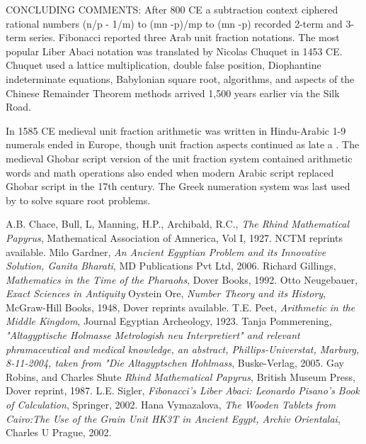 \documentclass[12pt]{article}
\begin{document}
CONCLUDING COMMENTS: After 800 CE a subtraction context ciphered rational numbers (n/p - 1/m) to (mn -p)/mp to (mn -p)  recorded 2-term and 3-term series.  Fibonacci reported three Arab unit fraction notations. The most popular Liber Abaci notation was translated by Nicolas Chuquet in 1453 CE. Chuquet used a lattice multiplication, double false position, Diophantine indeterminate equations, Babylonian square root, algorithms, and aspects of the Chinese Remainder Theorem methods arrived 1,500 years earlier via the Silk Road. 

In 1585 CE medieval unit fraction arithmetic was written in Hindu-Arabic 1-9 numerals ended in Europe, though unit fraction aspects continued as late a . The medieval Ghobar script version of the unit fraction system contained arithmetic words and math operations also ended when modern Arabic script replaced Ghobar script in the 17th century. The Greek numeration system was last used by   to solve square root problems. 

\begin{thebibliography}{10}
  A.B. Chace, Bull, L, Manning, H.P., Archibald, R.C., \emph{The Rhind Mathematical Papyrus}, Mathematical Association of Amnerica, Vol I, 1927. NCTM reprints available. 
 Milo Gardner, \emph{An Ancient Egyptian Problem and its Innovative Solution, Ganita Bharati}, MD Publications Pvt Ltd, 2006.
Richard Gillings, \emph{Mathematics in the Time of the Pharaohs}, Dover Books, 1992.
 Otto Neugebauer, \emph{Exact Sciences in Antiquity}
 Oystein Ore, \emph{Number Theory and its History}, McGraw-Hill Books, 1948, Dover reprints available.
 T.E. Peet, \emph{Arithmetic in the Middle Kingdom}, Journal Egyptian Archeology, 1923.
 Tanja Pommerening, \emph{"Altagyptische Holmasse Metrologish neu Interpretiert" and relevant phramaceutical and medical knowledge, an abstract,  Phillips-Universtat, Marburg, 8-11-2004, taken from "Die Altagyptschen Hohlmass}, Buske-Verlag, 2005.
 Gay Robins, and Charles Shute \emph{Rhind Mathematical Papyrus}, British Museum Press, Dover reprint, 1987.
 L.E. Sigler, \emph{Fibonacci's Liber Abaci: Leonardo Pisano's Book of Calculation}, Springer, 2002.
 Hana Vymazalova, \emph{The Wooden Tablets from Cairo:The Use of the Grain Unit HK3T in Ancient Egypt, Archiv Orientalai}, Charles U Prague, 2002.
\end{thebibliography}




\end{document}

